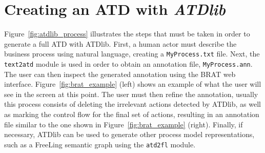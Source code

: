 \section{Creating an ATD with \emph{ATDlib}}
\label{sec:atdlib_tour}

Figure~\ref{fig:atdlib_process} illustrates the steps that must be taken in
order to generate a full ATD with ATDlib. First, a human actor must describe
the business process using natural language, creating a \texttt{MyProcess.txt}
file. Next, the \texttt{text2atd} module is used in order to obtain an
annotation file, \texttt{MyProcess.ann}. The user can then inspect the generated
annotation using the BRAT web interface. Figure~\ref{fig:brat_example} (left)
shows an example of what the user will see in the screen at this point. The user
must then refine the annotation, usually this process consists of deleting the
irrelevant actions detected by ATDlib, as well as marking the control flow for
the final set of actions, resulting in an annotation file similar to the one
shown in Figure~\ref{fig:brat_example} (right). Finally, if necessary, ATDlib
can be used to generate other process model representations, such as a FreeLing
semantic graph using the \texttt{atd2fl} module.


